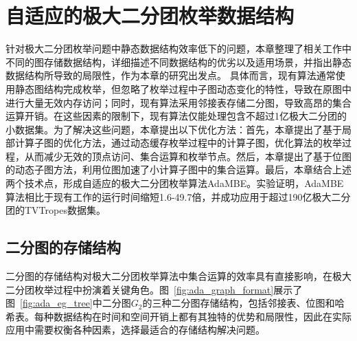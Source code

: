 \chapter{自适应的极大二分团枚举数据结构}
\label{ch:adapt_mbe}

针对极大二分团枚举问题中静态数据结构效率低下的问题，本章整理了相关工作中不同的图存储数据结构，详细描述不同数据结构的优劣以及适用场景，并指出静态数据结构所导致的局限性，作为本章的研究出发点。
具体而言，现有算法通常使用静态图结构完成枚举，但忽略了枚举过程中子图动态变化的特性，导致在原图中进行大量无效内存访问；同时，现有算法采用邻接表存储二分图，导致高昂的集合运算开销。在这些因素的限制下，现有算法仅能处理包含不超过1亿极大二分团的小数据集。为了解决这些问题，本章提出以下优化方法：首先，本章提出了基于局部计算子图的优化方法，通过动态缓存枚举过程中的计算子图，优化算法的枚举过程，从而减少无效的顶点访问、集合运算和枚举节点。然后，本章提出了基于位图的动态子图方法，利用位图加速了小计算子图中的集合运算。最后，本章结合上述两个技术点，形成自适应的极大二分团枚举算法AdaMBE。实验证明，AdaMBE算法相比于现有工作的运行时间缩短1.6-49.7倍，并成功应用于超过190亿极大二分团的TVTropes数据集。




\section{二分图的存储结构}
\label{subsec:ada_representation}

二分图的存储结构对极大二分团枚举算法中集合运算的效率具有直接影响，在极大二分团枚举过程中扮演着关键角色。图~\ref{fig:ada_graph_format}展示了图~\ref{fig:ada_eg_tree}中二分图$G_2$的三种二分图存储结构，包括邻接表、位图和哈希表。每种数据结构在时间和空间开销上都有其独特的优势和局限性，因此在实际应用中需要权衡各种因素，选择最适合的存储结构解决问题。

